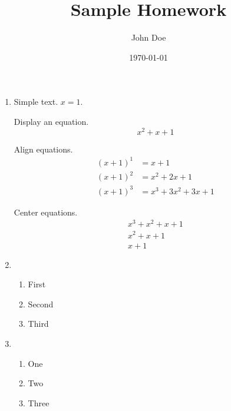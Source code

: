 \documentclass[a4paper,10pt]{article}
\title{Sample Homework}
\author{John Doe}
\date{\today}
\begin{document}
\maketitle

\begin{enumerate}
  \item
    Simple text. $x = 1$.

    Display an equation.
    \[
      x^2 + x + 1
    \]

    Align equations.
    \begin{align*}
      {(x + 1)}^1 &= x + 1 \\
      {(x + 1)}^2 &= x^2 + 2x + 1 \\
      {(x + 1)}^3 &= x^3 + 3x^2 + 3x + 1
    \end{align*}

    Center equations.
    \begin{gather*}
      x^3 + x^2 + x + 1 \\
      x^2 + x + 1 \\
      x + 1
    \end{gather*}

  \item
    \begin{enumerate}
      \item First

      \item Second

      \item Third
    \end{enumerate}

  \item
    \begin{enumerate}[label=(\arabic*)]
      \item One

      \item Two

      \item Three
    \end{enumerate}
\end{enumerate}
\end{document}
